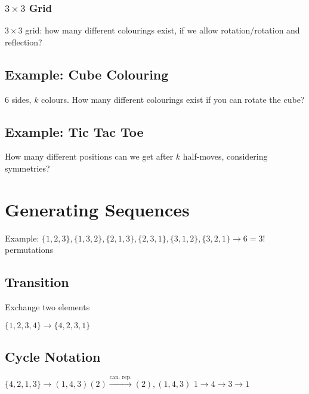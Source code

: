 \documentclass[11pt]{article}
\begin{document}
\subsubsection{$ 3 \times 3 $ Grid}

$ 3 \times 3 $ grid: how many different colourings exist, if we allow rotation/rotation and reflection?


\subsection{Example: Cube Colouring}

6 sides, $ k $ colours. How many different colourings exist if you can rotate the cube?

\subsection{Example: Tic Tac Toe}

How many different positions can we get after $ k $ half-moves, considering symmetries?









\section{Generating Sequences}

Example: $ \{ 1, 2, 3 \}, \{ 1, 3, 2 \}, \{ 2, 1, 3 \}, \{ 2, 3, 1 \}, \{ 3, 1, 2 \}, \{ 3, 2, 1 \} \rightarrow 6 = 3! $ permutations

\subsection{Transition}

Exchange two elements

$ \{ 1, 2, 3, 4 \} \longrightarrow \{ 4, 2, 3, 1 \} $

\subsection{Cycle Notation}

$ \{ 4, 2, 1, 3 \} \longrightarrow (1, 4, 3) (2) \overset{\text{can. rep.}}{\longrightarrow}(2), (1, 4, 3) $
$ 1 \rightarrow 4 \rightarrow 3 \rightarrow 1 $
\end{document}
